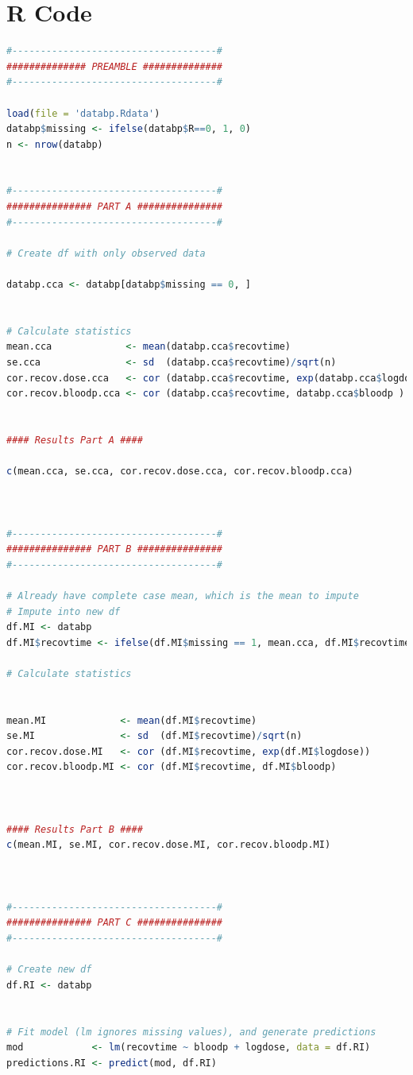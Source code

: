 \documentclass{article}
\numberwithin{equation}{section} %
\begin{document}
\section{R Code}
\begin{lstlisting}[language=R]
#------------------------------------#
############## PREAMBLE ##############
#------------------------------------# 

load(file = 'databp.Rdata')
databp$missing <- ifelse(databp$R==0, 1, 0)
n <- nrow(databp)


#------------------------------------#
############### PART A ###############
#------------------------------------#

# Create df with only observed data

databp.cca <- databp[databp$missing == 0, ]


# Calculate statistics
mean.cca             <- mean(databp.cca$recovtime)
se.cca               <- sd  (databp.cca$recovtime)/sqrt(n)
cor.recov.dose.cca   <- cor (databp.cca$recovtime, exp(databp.cca$logdose))
cor.recov.bloodp.cca <- cor (databp.cca$recovtime, databp.cca$bloodp )


#### Results Part A ####

c(mean.cca, se.cca, cor.recov.dose.cca, cor.recov.bloodp.cca)



#------------------------------------#
############### PART B ###############
#------------------------------------#

# Already have complete case mean, which is the mean to impute
# Impute into new df
df.MI <- databp
df.MI$recovtime <- ifelse(df.MI$missing == 1, mean.cca, df.MI$recovtime)

# Calculate statistics


mean.MI             <- mean(df.MI$recovtime)
se.MI               <- sd  (df.MI$recovtime)/sqrt(n)
cor.recov.dose.MI   <- cor (df.MI$recovtime, exp(df.MI$logdose))
cor.recov.bloodp.MI <- cor (df.MI$recovtime, df.MI$bloodp)



#### Results Part B ####
c(mean.MI, se.MI, cor.recov.dose.MI, cor.recov.bloodp.MI)



#------------------------------------#
############### PART C ###############
#------------------------------------#

# Create new df
df.RI <- databp


# Fit model (lm ignores missing values), and generate predictions
mod            <- lm(recovtime ~ bloodp + logdose, data = df.RI)
predictions.RI <- predict(mod, df.RI)


\end{lstlisting}
\end{document}
